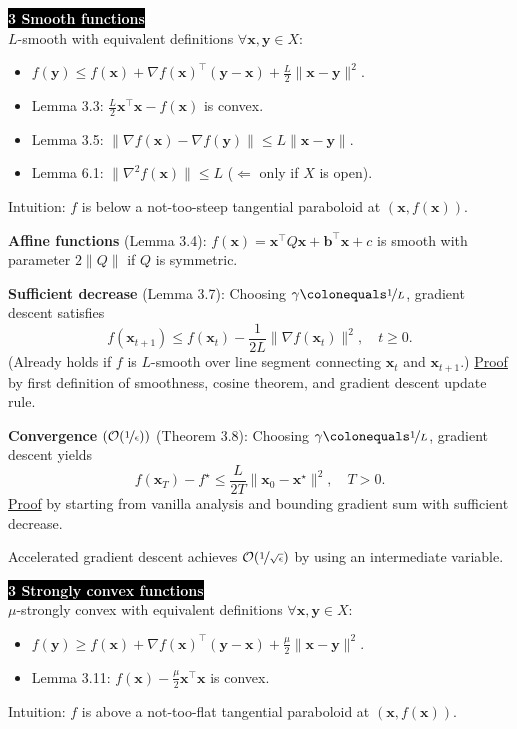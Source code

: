 \documentclass{article}
\renewcommand{\vec}[1]{\mathbf{#1}}
\newcommand{\mat}[1]{#1}
\newcommand{\transpose}[1]{#1^\top}
\newenvironment{topic}[1]
{\textbf{\sffamily \colorbox{black}{\textcolor{white}{#1}}} \\ \vspace{0.2cm}}
{}
\begin{document}
\begin{multicols*}{3}
    \begin{topic}{3 Smooth functions}
        $L$-smooth with equivalent definitions $\forall \vec{x}, \vec{y} \in X$:
        \begin{itemize}
            \item $f(\vec{y}) \leq f(\vec{x}) + \transpose{\nabla f(\vec{x})} (\vec{y} - \vec{x}) + \frac{L}{2} \| \vec{x} - \vec{y} \|^2$.
            \item Lemma 3.3: $\frac{L}{2} \transpose{\vec{x}} \vec{x} - f(\vec{x})$ is convex.
            \item Lemma 3.5: $\| \nabla f(\vec{x}) - \nabla f(\vec{y}) \| \leq L \| \vec{x} - \vec{y} \|$.
            \item Lemma 6.1: $\| \nabla^2 f(\vec{x}) \| \leq L$ ($\Leftarrow$ only if $X$ is open).
        \end{itemize}
        Intuition: $f$ is below a not-too-steep tangential paraboloid at $(\vec{x}, f(\vec{x}))$.

        \textbf{Affine functions} (Lemma 3.4): $f(\vec{x}) = \transpose{\vec{x}} \mat{Q} \vec{x} +
            \transpose{\vec{b}} \vec{x} + c$ is smooth with parameter $2 \| \mat{Q} \|$ if $\mat{Q}$ is
        symmetric.

        \textbf{Sufficient decrease} (Lemma 3.7): Choosing $\gamma \colonequals \nicefrac{1}{L}$, gradient descent satisfies \[
            f(\vec{x}_{t+1}) \leq f(\vec{x}_t) - \frac{1}{2L} \| \nabla f(\vec{x}_t) \|^2, \quad t \geq 0.
        \]
        (Already holds if $f$ is $L$-smooth over line segment connecting $\vec{x}_t$ and $\vec{x}_{t+1}$.)
        \underline{Proof} by first definition of smoothness, cosine theorem, and gradient descent update rule.

        \textbf{Convergence} $(\mathcal{O}(\nicefrac{1}{\epsilon}))$ (Theorem 3.8): Choosing $\gamma \colonequals \nicefrac{1}{L}$, gradient descent yields \[
            f(\vec{x}_T) - f^\star \leq \frac{L}{2T} \| \vec{x}_0 - \vec{x}^\star \|^2, \quad T > 0.
        \]
        \underline{Proof} by starting from vanilla analysis and bounding gradient sum with sufficient decrease.

        Accelerated gradient descent achieves $\mathcal{O}(\nicefrac{1}{\sqrt{\epsilon}})$ by using an
        intermediate variable.
    \end{topic}

    \begin{topic}{3 Strongly convex functions}
        $\mu$-strongly convex with equivalent definitions $\forall \vec{x}, \vec{y} \in X$:
        \begin{itemize}
            \item $f(\vec{y}) \geq f(\vec{x}) + \transpose{\nabla f(\vec{x})} (\vec{y} - \vec{x}) + \frac{\mu}{2} \| \vec{x} - \vec{y} \|^2$.
            \item Lemma 3.11: $f(\vec{x}) - \frac{\mu}{2} \transpose{\vec{x}} \vec{x}$ is convex.
        \end{itemize}
        Intuition: $f$ is above a not-too-flat tangential paraboloid at $(\vec{x}, f(\vec{x}))$.


\end{topic}
\end{multicols*}
\end{document}
